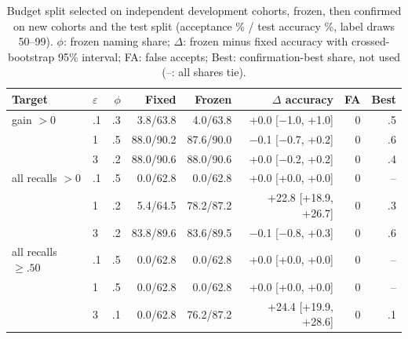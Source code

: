 \begin{table}[t]
\caption{Budget split selected on independent development cohorts, frozen, then confirmed on new cohorts and the test split (acceptance \% / test accuracy \%, label draws 50--99). $\phi$: frozen naming share; $\Delta$: frozen minus fixed accuracy with crossed-bootstrap 95\% interval; FA: false accepts; Best: confirmation-best share, not used (--: all shares tie).}
\label{tab:budgetconf}\small\setlength{\tabcolsep}{1.8pt}
\centering
\begin{tabular}{@{}llrrrrrr@{}}\toprule
Target & $\varepsilon$ & $\phi$ & Fixed & Frozen & $\Delta$ accuracy & FA & Best \\
\midrule
gain $>0$ & .1 & .3 & 3.8/63.8 & 4.0/63.8 & +0.0 [$-$1.0, +1.0] & 0 & .5 \\
 & 1 & .5 & 88.0/90.2 & 87.6/90.0 & $-$0.1 [$-$0.7, +0.2] & 0 & .6 \\
 & 3 & .2 & 88.0/90.6 & 88.0/90.6 & +0.0 [$-$0.2, +0.2] & 0 & .4 \\
all recalls $>0$ & .1 & .5 & 0.0/62.8 & 0.0/62.8 & +0.0 [+0.0, +0.0] & 0 & -- \\
 & 1 & .2 & 5.4/64.5 & 78.2/87.2 & +22.8 [+18.9, +26.7] & 0 & .3 \\
 & 3 & .2 & 83.8/89.6 & 83.6/89.5 & $-$0.1 [$-$0.8, +0.3] & 0 & .6 \\
all recalls $\ge.50$ & .1 & .5 & 0.0/62.8 & 0.0/62.8 & +0.0 [+0.0, +0.0] & 0 & -- \\
 & 1 & .5 & 0.0/62.8 & 0.0/62.8 & +0.0 [+0.0, +0.0] & 0 & -- \\
 & 3 & .1 & 0.0/62.8 & 76.2/87.2 & +24.4 [+19.9, +28.6] & 0 & .1 \\
\bottomrule\end{tabular}
\end{table}
